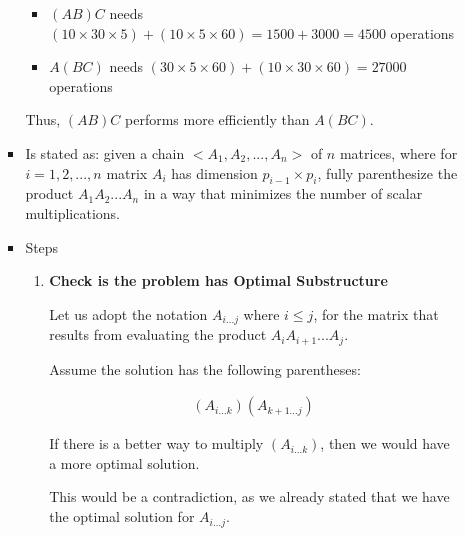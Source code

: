 \documentclass[12pt]{article}
\begin{document}
\begin{enumerate}[1.]
\begin{itemize}
\begin{itemize}
            \bigskip

            \begin{itemize}
                \item $(AB)C$ needs $(10 \times 30 \times 5) + (10 \times 5 \times 60) = 1500 + 3000 = 4500$ operations
                \item $A(BC)$ needs $(30 \times 5 \times 60) + (10 \times 30 \times 60) = 27000$ operations
            \end{itemize}

            \bigskip

            Thus, $(AB)C$ performs more efficiently than $A(BC)$.

            \bigskip

            \item Is stated as: given a chain $<A_1, A_2, ..., A_n>$ of $n$ matrices,
            where for $i = 1,2,...,n$ matrix $A_i$ has dimension $p_{i-1} \times p_i$,
            fully parenthesize the product $A_1A_2...A_n$ in a way that minimizes the number of scalar multiplications.

            \item Steps

            \begin{enumerate}[1.]
                \item \textbf{Check is the problem has Optimal Substructure}

                \bigskip

                Let us adopt the notation $A_{i...j}$ where $i \leq j$, for the matrix
                that results from evaluating the product $A_iA_{i+1}...A_j$.

                \bigskip

                Assume the solution has the following parentheses:

                \begin{align*}
                    (A_{i...k})(A_{k+1...j})
                \end{align*}

                \bigskip

                If there is a better way to multiply $(A_{i...k})$, then we
                would have a more optimal solution.

                \bigskip

                This would be a contradiction, as we already stated that we have the optimal
                solution for $A_{i...j}$.


\end{enumerate}
\end{itemize}
\end{itemize}
\end{enumerate}
\end{document}
